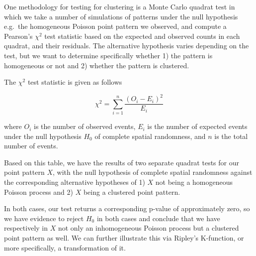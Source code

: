 \documentclass[
  12pt,
]{article}
\begin{document}
One methodology for testing for clustering is a Monte Carlo quadrat test
in which we take a number of simulations of patterns under the null
hypothesis e.g.~the homogeneous Poisson point pattern we observed, and
compute a Pearson's \(\chi^2\) test statistic based on the expected and
observed counts in each quadrat, and their residuals. The alternative
hypothesis varies depending on the test, but we want to determine
specifically whether 1) the pattern is homogeneous or not and 2) whether
the pattern is clustered.

The \(\chi^2\) test statistic is given as follows

\[\chi^2 = \sum_{i=1}^n \frac{(O_i - E_i)^2}{E_i}\]

where \(O_i\) is the number of observed events, \(E_i\) is the number of
expected events under the null hypothesis \(H_0\) of complete spatial
randomness, and \(n\) is the total number of events.

\begin{table}[!h]

\caption{\label{tab:tbl-quadrat-test}The results of the quadrat tests of the point process.}
\centering
{}
\end{table}

Based on this table, we have the results of two separate quadrat tests
for our point pattern \(X\), with the null hypothesis of complete
spatial randomness against the corresponding alternative hypotheses of
1) \(X\) not being a homogeneous Poisson process and 2) \(X\) being a
clustered point pattern.

In both cases, our test returns a corresponding p-value of approximately
zero, so we have evidence to reject \(H_0\) in both cases and conclude
that we have respectively in \(X\) not only an inhomogeneous Poisson
process but a clustered point pattern as well. We can further illustrate
this via Ripley's K-function, or more specifically, a transformation of
it.
\end{document}
